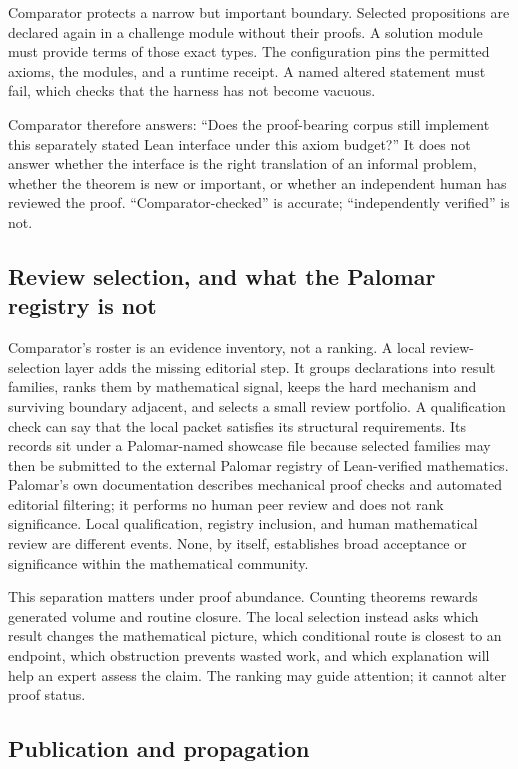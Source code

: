 \documentclass[10pt]{article}
\begin{document}
Comparator protects a narrow but important boundary. Selected propositions are
declared again in a challenge module without their proofs. A solution module
must provide terms of those exact types. The configuration pins the permitted
axioms, the modules, and a runtime receipt. A named altered statement must fail,
which checks that the harness has not become vacuous.

Comparator therefore answers: ``Does the proof-bearing corpus still implement
this separately stated Lean interface under this axiom budget?'' It does not
answer whether the interface is the right translation of an informal problem,
whether the theorem is new or important, or whether an independent human has
reviewed the proof. ``Comparator-checked'' is accurate; ``independently
verified'' is not.

\subsection{Review selection, and what the Palomar registry is not}

Comparator's roster is an evidence inventory, not a ranking. A local
review-selection layer adds the missing editorial step. It groups declarations
into result families, ranks them by mathematical signal, keeps the hard
mechanism and surviving boundary adjacent, and selects a small review
portfolio. A qualification check can say that the local packet satisfies its
structural requirements. Its records sit under a Palomar-named showcase file
because selected families may then be submitted to the external Palomar
registry of Lean-verified mathematics. Palomar's own documentation describes
mechanical proof checks and automated editorial filtering; it performs no human
peer review and does not rank significance. Local qualification, registry
inclusion, and human mathematical review are different events. None, by
itself, establishes broad acceptance or significance within the mathematical
community.

This separation matters under proof abundance. Counting theorems rewards
generated volume and routine closure. The local selection instead asks which result changes
the mathematical picture, which conditional route is closest to an endpoint,
which obstruction prevents wasted work, and which explanation will help an
expert assess the claim. The ranking may guide attention; it cannot alter proof
status.

\subsection{Publication and propagation}
\end{document}
